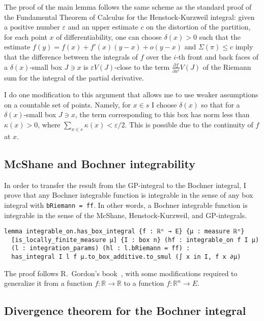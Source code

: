 \documentclass[a4paper, UKenglish,cleveref, autoref, thm-restate]{lipics-v2021}
\newcommand{\bbR}{\mathbb{R}}
\newcommand{\eps}{\varepsilon}
\begin{document}
The proof of the main lemma follows the same scheme as the standard
proof of the Fundamental Theorem of Calculus for the Henstock-Kurzweil
integral: given a positive number \(\eps\) and an upper estimate \(c\)
on the distortion of the partition, for each point \(x\) of
differentiability, one can choose \(\delta(x)>0\) such that the
estimate \(f(y)=f(x)+f'(x)(y-x)+o(y-x)\) and \(\Sigma(\pi)\le c\)
imply that the difference between the integrals of
\(f\) over the \(i\)-th front and back faces of a \(\delta(x)\)-small
box \(J\ni x\) is \(\eps V(J)\)-close to the term
\(\frac{\partial f}{\partial x^{i}}V(J)\) of the Riemann sum for the
integral of the partial derivative.

I do one modification to this argument that allows me to use weaker
assumptions on a countable set of points. Namely, for \(x\in s\) I
choose \(\delta(x)\) so that for a \(\delta(x)\)-small box \(J\ni x\),
the term corresponding to this box has norm less than \(\kappa(x)>0\),
where \(\sum_{x\in s}\kappa(x)<\eps/2\). This is possible due to the
continuity of \(f\) at \(x\).

\subsection{McShane and Bochner integrability}%
\label{sec:mcsh-bochn-integr}

In order to transfer the result from the GP-integral to the Bochner
integral, I prove that any Bochner integrable function is integrable
in the sense of any box integral with \lstinline~bRiemann = ff~. In
other words, a Bochner integrable function is integrable in the sense
of the McShane, Henstock-Kurzweil, and GP-integrals.

\begin{lstlisting}
lemma integrable_on.has_box_integral {f : ℝⁿ → E} {μ : measure ℝⁿ}
  [is_locally_finite_measure μ] {I : box n} (hf : integrable_on f I μ)
  (l : integration_params) (hl : l.bRiemann = ff) :
  has_integral I l f μ.to_box_additive.to_smul (∫ x in I, f x ∂μ)
\end{lstlisting}

The proof follows R.~Gordon's book~\cite{Gordon55}, with some
modifications required to generalize it from a function
\(f\colon\bbR\to\bbR\) to a function \(f\colon\bbR^{n}\to E\).


\subsection{Divergence theorem for the Bochner integral}%
\label{sec:diverg-theor-bochn}
\end{document}
